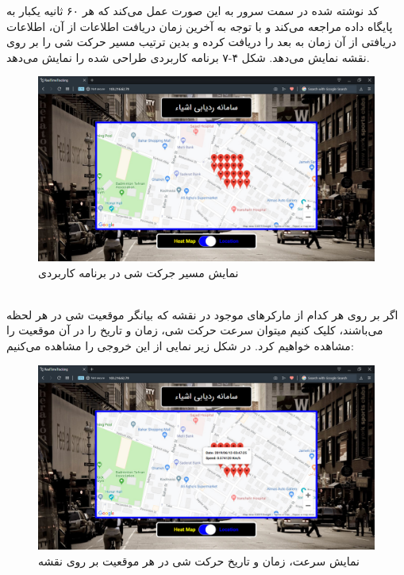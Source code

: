 کد نوشته شده در سمت سرور به این صورت عمل می‌کند که هر ۶۰ ثانیه یکبار به پایگاه داده مراجعه می‌کند و با توجه به آخرین زمان دریافت اطلاعات از آن، اطلاعات دریافتی از  آن زمان به بعد را دریافت کرده و بدین ترتیب مسیر حرکت شی را بر روی نقشه نمایش می‌دهد.
\newpage
شکل ۴-۷ برنامه کاربردی طراحی شده را نمایش می‌دهد.
\\
 \begin{figure}[!h]
 	\centerline{\includegraphics[width=.9\textwidth]{webapp3}}
 	\caption{نمایش مسیر جرکت شی در برنامه کاربردی}
 \end{figure}
\\
 اگر بر روی هر کدام از مارکرهای موجود در نقشه که بیانگر موقعیت شی در هر لحظه می‌باشند، کلیک کنیم میتوان سرعت حرکت شی، زمان و تاریخ را در آن موقعیت را مشاهده خواهیم کرد. در شکل زیر نمایی از این خروجی را مشاهده می‌کنیم:
  \begin{figure}[!h]
 	\centerline{\includegraphics[width=.9\textwidth]{webapp4}}
 	\caption{نمایش سرعت، زمان و تاریخ حرکت شی در هر موقعیت بر روی نقشه}
 \end{figure}
